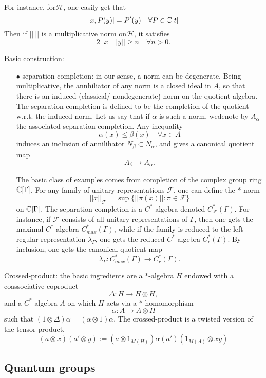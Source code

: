 For instance, for$\mathcal H$, one easily get that 
\[[x,P(y)] = P'(y) \quad \forall P\in \mathbb C[t]\]
Then if $||\ ||$ is a multiplicative norm on$\mathcal H$, it satisfies
\[ 2 ||x|| \ ||y|| \geq n \quad \forall n>0.\]   

Basic construction:
\begin{itemize}
\item[$\bullet$] separation-completion: in our sense, a norm can be degenerate. Being multiplicative, the annhiliator of any norm is a closed ideal in $A$, so that there is an induced (classical/ nondegenerate) norm on the quotient algebra. The separation-completion is defined to be the completion of the quotient w.r.t. the induced norm. Let us say that if $\alpha$ is such a norm, wedenote by $A_\alpha$ the associated separation-completion. Any inequality 
\[\alpha(x) \leq \beta (x) \quad \forall x\in A\]
induces an inclusion of annilihator $N_\beta \subset N_\alpha$, and gives a canonical quotient map
\[A_\beta \rightarrow A_\alpha.\]

The basic class of examples comes from completion of the complex group ring $\mathbb C[\Gamma]$. For any family of unitary representations $\mathcal F$, one can define the $*$-norm
\[||x||_{\mathcal F} = \sup \{||\pi(x)|| : \pi\in \mathcal F\}\]
on $\mathbb C[\Gamma]$. The separation-completion is a $C^*$-algebra denoted $C^*_{\mathcal F}(\Gamma)$. For instance, if $\mathcal F$ consists of all unitary representations of $\Gamma$, then one gets the maximal $C^*$-algebra $C_{max}^*(\Gamma)$, while if the family is reduced to the left regular representation $\lambda_\Gamma$, one gets the reduced $C^*$-algebra $C^*_r(\Gamma)$. By inclusion, one gets the canonical quotient map
\[\lambda_\Gamma : C^*_{max}(\Gamma) \rightarrow C_r^*(\Gamma).\]  
 
\end{itemize}

Crossed-product: the basic ingredients are a $*$-algebra $H$ endowed with a coassociative coproduct
\[\Delta : H \rightarrow H\otimes H,\]
and a $C^*$-algebra $A$ on which $H$ acts via a $*$-homomorphism
\[\alpha : A \rightarrow A\otimes H\]
such that $(1\otimes \Delta)\alpha = (\alpha \otimes 1) \alpha$. The crossed-product is a twisted version of the tensor product.  
\[(a\otimes x )(a'\otimes y ) := (a\otimes 1_{M(H)}) \alpha (a')(1_{M(A)}\otimes xy)\]
 
\subsection{Quantum groups}
 
